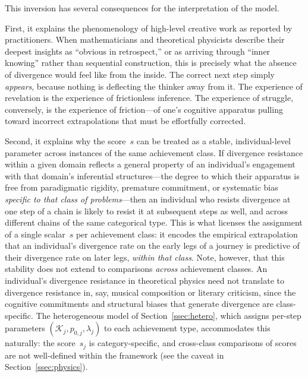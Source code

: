 \documentclass{article}
\begin{document}
This inversion has several consequences for the interpretation of the model.

First, it explains the phenomenology of high-level creative work as reported by practitioners. When mathematicians and theoretical physicists describe their deepest insights as ``obvious in retrospect,'' or as arriving through ``inner knowing'' rather than sequential construction, this is precisely what the absence of divergence would feel like from the inside. The correct next step simply \emph{appears}, because nothing is deflecting the thinker away from it. The experience of revelation is the experience of frictionless inference. The experience of struggle, conversely, is the experience of friction---of one's cognitive apparatus pulling toward incorrect extrapolations that must be effortfully corrected.

Second, it explains why the score~$s$ can be treated as a stable, 
individual-level parameter across instances of the same achievement 
class. If divergence resistance within a given domain reflects a 
general property of an individual's engagement with that domain's 
inferential structures---the degree to which their apparatus is free 
from paradigmatic rigidity, premature commitment, or systematic bias 
\emph{specific to that class of problems}---then an individual who 
resists divergence at one step of a chain is likely to resist it at 
subsequent steps as well, and across different chains of the same 
categorical type. This is what licenses the assignment of a single 
scalar~$s$ per achievement class: it encodes the empirical 
extrapolation that an individual's divergence rate on the early legs 
of a journey is predictive of their divergence rate on later legs, 
\emph{within that class}. Note, however, that this stability does 
not extend to comparisons \emph{across} achievement classes. An 
individual's divergence resistance in theoretical physics need not 
translate to divergence resistance in, say, musical composition or 
literary criticism, since the cognitive commitments and structural 
biases that generate divergence are class-specific. The heterogeneous 
model of Section~\ref{ssec:hetero}, which assigns per-step parameters 
$(\mathcal{K}_j, p_{0,j}, \lambda_j)$ to each achievement type, 
accommodates this naturally: the score~$s_j$ is category-specific, 
and cross-class comparisons of scores are not well-defined within the 
framework (see the caveat in Section~\ref{ssec:physics}).
\end{document}
